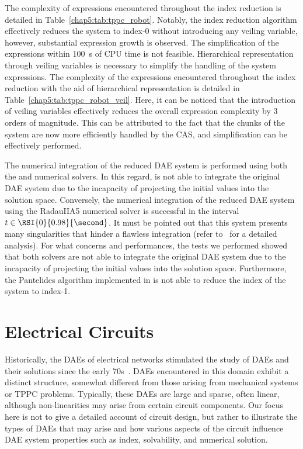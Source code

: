 The complexity of expressions encountered throughout the index reduction is detailed in Table~\ref{chap5:tab:tppc_robot}. Notably, the index reduction algorithm effectively reduces the system to index-0 without introducing any veiling variable, however, substantial expression growth is observed. The simplification of the expressions within \SI{100}{\second} of \ac{CPU} time is not feasible. Hierarchical representation through veiling variables is necessary to simplify the handling of the system expressions. The complexity of the expressions encountered throughout the index reduction with the aid of hierarchical representation is detailed in Table~\ref{chap5:tab:tppc_robot_veil}. Here, it can be noticed that the introduction of veiling variables effectively reduces the overall expression complexity by 3 orders of magnitude. This can be attributed to the fact that the chunks of the system are now more efficiently handled by the \ac{CAS}, and simplification can be effectively performed.

The numerical integration of the reduced \ac{DAE} system is performed using both the \Maple{} and \Indigo{} numerical solvers. In this regard, \Maple{} is not able to integrate the original \ac{DAE} system due to the incapacity of projecting the initial values into the solution space. Conversely, the numerical integration of the reduced \ac{DAE} system using the RadauIIA5 \Indigo{} numerical solver is successful in the interval $t \in \RSI{0}{0.98}{\second}$. It must be pointed out that this system presents many singularities that hinder a flawless integration (refer to~\cite{schwarz2020singularities} for a detailed analysis). For what concerns \Mathematica{} and \Matlab{} performances, the tests we performed showed that both solvers are not able to integrate the original \ac{DAE} system due to the incapacity of projecting the initial values into the solution space. Furthermore, the Pantelides algorithm implemented in \Matlab{} is not able to reduce the index of the system to index-1.

\section{Electrical Circuits}
\label{chap5:sec:electrical_circuits}

Historically, the \acp{DAE} of electrical networks stimulated the study of \acp{DAE} and their solutions since the early 70s~\cite{gear1971simultaneous}. \acp{DAE} encountered in this domain exhibit a distinct structure, somewhat different from those arising from mechanical systems or \ac{TPPC} problems. Typically, these \acp{DAE} are large and sparse, often linear, although non-linearities may arise from certain circuit components. Our focus here is not to give a detailed account of circuit design, but rather to illustrate the types of \acp{DAE} that may arise and how various aspects of the circuit influence \ac{DAE} system properties such as index, solvability, and numerical solution.

